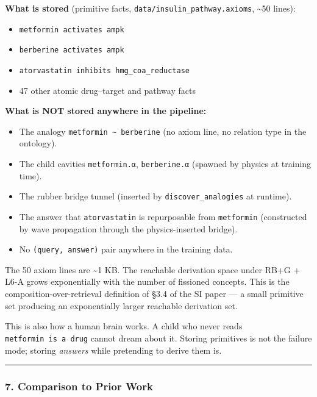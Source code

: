 \documentclass[
  11pt,
  a4paper,
]{article}
\providecommand{\tightlist}{%
  \setlength{\itemsep}{0pt}\setlength{\parskip}{0pt}}
\begin{document}
\textbf{What is stored} (primitive facts,
\texttt{data/insulin\_pathway.axioms}, \textasciitilde50 lines):

\begin{itemize}
\tightlist
\item
  \texttt{metformin\ activates\ ampk}
\item
  \texttt{berberine\ activates\ ampk}
\item
  \texttt{atorvastatin\ inhibits\ hmg\_coa\_reductase}
\item
  47 other atomic drug--target and pathway facts
\end{itemize}

\textbf{What is NOT stored anywhere in the pipeline:}

\begin{itemize}
\tightlist
\item
  The analogy \texttt{metformin\ \textasciitilde{}\ berberine} (no axiom
  line, no relation type in the ontology).
\item
  The child cavities \texttt{metformin.α}, \texttt{berberine.α} (spawned
  by physics at training time).
\item
  The rubber bridge tunnel (inserted by \texttt{discover\_analogies} at
  runtime).
\item
  The answer that \texttt{atorvastatin} is repurposable from
  \texttt{metformin} (constructed by wave propagation through the
  physics-inserted bridge).
\item
  No \texttt{(query,\ answer)} pair anywhere in the training data.
\end{itemize}

The 50 axiom lines are \textasciitilde1 KB. The reachable derivation
space under RB+G + L6-A grows exponentially with the number of fissioned
concepts. This is the composition-over-retrieval definition of §3.4 of
the SI paper --- a small primitive set producing an exponentially larger
reachable derivation set.

This is also how a human brain works. A child who never reads
\texttt{metformin\ is\ a\ drug} cannot dream about it. Storing
primitives is not the failure mode; storing \emph{answers} while
pretending to derive them is.

\begin{center}\rule{0.5\linewidth}{0.5pt}\end{center}

\subsubsection{7. Comparison to Prior
Work}\label{comparison-to-prior-work}
\end{document}
